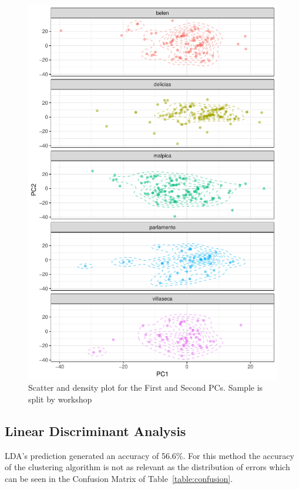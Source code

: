 \documentclass[review]{elsarticle}
\begin{document}
\begin{figure}[htp]
	\centering
\includegraphics[width=\linewidth]{figs/pca}
\caption{Scatter and density plot for the First and Second PCs. Sample is split by workshop}
\label{pca}
\end{figure} 

\subsection{Linear Discriminant Analysis}

LDA's prediction generated an accuracy of 56.6\%. For this method the accuracy of the clustering algorithm is not as relevant as the distribution of errors which can be seen in the Confusion Matrix of Table~\ref{table:confusion}.
\end{document}
